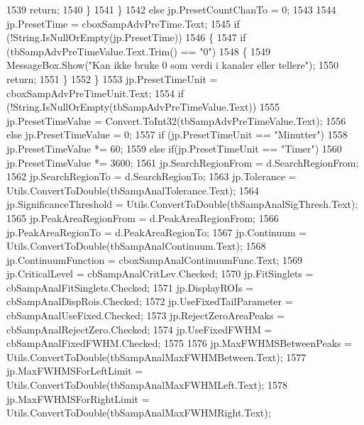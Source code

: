\begin{DoxyCode}
1539                     \textcolor{keywordflow}{return};
1540                 \}
1541             \}
1542             \textcolor{keywordflow}{else} jp.PresetCountChanTo = 0;
1543 
1544             jp.PresetTime = cboxSampAdvPreTime.Text;
1545             \textcolor{keywordflow}{if} (!String.IsNullOrEmpty(jp.PresetTime))
1546             \{
1547                 \textcolor{keywordflow}{if} (tbSampAdvPreTimeValue.Text.Trim() == \textcolor{stringliteral}{"0"})
1548                 \{
1549                     MessageBox.Show(\textcolor{stringliteral}{"Kan ikke bruke 0 som verdi i kanaler eller tellere"});
1550                     \textcolor{keywordflow}{return};
1551                 \}
1552             \}
1553             jp.PresetTimeUnit = cboxSampAdvPreTimeUnit.Text;
1554             \textcolor{keywordflow}{if} (!String.IsNullOrEmpty(tbSampAdvPreTimeValue.Text))
1555                 jp.PresetTimeValue = Convert.ToInt32(tbSampAdvPreTimeValue.Text);
1556             \textcolor{keywordflow}{else} jp.PresetTimeValue = 0;
1557             \textcolor{keywordflow}{if} (jp.PresetTimeUnit == \textcolor{stringliteral}{"Minutter"})
1558                 jp.PresetTimeValue *= 60;
1559             \textcolor{keywordflow}{else} \textcolor{keywordflow}{if}(jp.PresetTimeUnit == \textcolor{stringliteral}{"Timer"})
1560                 jp.PresetTimeValue *= 3600;
1561             jp.SearchRegionFrom = d.SearchRegionFrom;
1562             jp.SearchRegionTo = d.SearchRegionTo;
1563             jp.Tolerance = Utils.ConvertToDouble(tbSampAnalTolerance.Text);
1564             jp.SignificanceThreshold = Utils.ConvertToDouble(tbSampAnalSigThresh.Text);
1565             jp.PeakAreaRegionFrom = d.PeakAreaRegionFrom;
1566             jp.PeakAreaRegionTo = d.PeakAreaRegionTo;
1567             jp.Continuum = Utils.ConvertToDouble(tbSampAnalContinuum.Text);
1568             jp.ContinuumFunction = cboxSampAnalContinuumFunc.Text;
1569             jp.CriticalLevel = cbSampAnalCritLev.Checked;
1570             jp.FitSinglets = cbSampAnalFitSinglets.Checked;
1571             jp.DisplayROIs = cbSampAnalDispRois.Checked;
1572             jp.UseFixedTailParameter = cbSampAnalUseFixed.Checked;
1573             jp.RejectZeroAreaPeaks = cbSampAnalRejectZero.Checked;
1574             jp.UseFixedFWHM = cbSampAnalFixedFWHM.Checked;
1575 
1576             jp.MaxFWHMSBetweenPeaks = Utils.ConvertToDouble(tbSampAnalMaxFWHMBetween.Text);
1577             jp.MaxFWHMSForLeftLimit = Utils.ConvertToDouble(tbSampAnalMaxFWHMLeft.Text);
1578             jp.MaxFWHMSForRightLimit = Utils.ConvertToDouble(tbSampAnalMaxFWHMRight.Text);

\end{DoxyCode}
